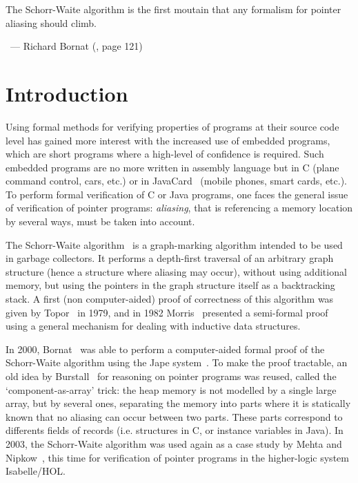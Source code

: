 


\hfill\begin{minipage}{0.6\textwidth}
\begin{slshape}
The Schorr-Waite algorithm is the first moutain that any formalism for
pointer aliasing should climb.
\end{slshape}

~\hfill --- Richard Bornat (\cite{bornat00mpc}, page 121)
\end{minipage}

\section{Introduction}

Using formal methods for verifying properties of programs at their
source code level has gained more interest with the increased use of
embedded programs, which are short programs where a high-level of
confidence is required. Such embedded programs are no more written in
assembly language but in C (plane command control, cars, etc.) or in
JavaCard~\cite{JavaCard} (mobile phones, smart cards, etc.).  To
perform formal verification of C or Java programs, one faces the
general issue of verification of pointer programs: \emph{aliasing},
that is referencing a memory location by several ways, must be taken
into account. 

The Schorr-Waite algorithm~\cite{schorr67cacm} is a graph-marking
algorithm intended to be used in garbage collectors. It performs a
depth-first traversal of an arbitrary graph structure (hence a
structure where aliasing may occur), without using additional memory,
but using the pointers in the graph structure itself as a backtracking
stack. A first (non computer-aided) proof of correctness of this
algorithm was given by Topor~\cite{topor79acta} in 1979, and in 1982
Morris~\cite{morris82} presented a semi-formal proof using a general
mechanism for dealing with inductive data structures.


In 2000, Bornat~\cite{bornat00mpc} was able to perform a
computer-aided formal proof of the Schorr-Waite algorithm using the
Jape system~\cite{bornat99}. To make the proof tractable, an old idea by
Burstall~\cite{burstall72} for reasoning on pointer programs was
reused, called the `component-as-array' trick: the heap
memory is not modelled by a single large array, but by several ones,
separating the memory into parts where it is statically known that no
aliasing can occur between two parts. These parts correspond to
differents fields of records (i.e. structures in C, or instance
variables in Java).
In 2003, the Schorr-Waite algorithm was used again as a case
study by Mehta and Nipkow~\cite{mehta03cade}, this time for
verification of pointer programs in the higher-logic system
Isabelle/HOL. 

